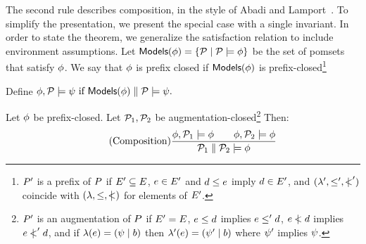 The second rule describes composition, in the style of Abadi and
Lamport~\cite{Abadi:1993:CS:151646.151649}.  To simplify the presentation, we
present the special case with a single invariant.
In order to state the theorem, we generalize the satisfaction relation to
include environment assumptions.  Let
\begin{math}
  \textsf{Models}{(\phi)} = \{ \mathcal{P} \mid \mathcal{P} \models \phi \}
\end{math}
be the set of pomsets that satisfy $\phi$.  We say that $\phi$ is prefix
closed if $\textsf{Models}{(\phi)}$ is prefix-closed\footnote{$P'$ is a prefix of
  $P$ if $E'\subseteq E$, $e\in E'$ and $ d\le e$
  imply $d\in E'$, and $(\lambda',\leq',\mathrel{\,\mid\!\!\!<}')$ coincide with
  $(\lambda,\leq,\mathrel{\,\mid\!\!\!<})$ for elements of $E'$.}
\begin{noenv}
  Define
  \begin{math}
    \phi, \mathcal{P} \models \psi  \text{ if } \textsf{Models}{(\phi)} \parallel \mathcal{P} \models \psi.
  \end{math}
\end{noenv}
\begin{proposition}%
  Let $\phi$ be prefix-closed.  Let $\mathcal{P}_1, \mathcal{P}_2$ be
  augmentation-closed\footnote{$P'$ is an augmentation of $P$ if
    $E'=E$, $e\le d$ implies $e\le'd$, $e\mathrel{\,\mid\!\!\!<}d$
    implies $e\mathrel{\,\mid\!\!\!<}'d$, and
    if $\lambda(e) = (\psi \mid b)$ then
    $\lambda'(e) = (\psi' \mid b)$ where $\psi'$ implies
    $\psi$.}  Then:
  \begin{displaymath}
    \tag{Composition}
    \frac{
      \phi, \mathcal{P}_1 \models\phi
      \qquad
      \phi, \mathcal{P}_2 \models\phi
    }{\mathcal{P}_1 \parallel \mathcal{P}_2 \models \phi}
  \end{displaymath}
\end{proposition}
